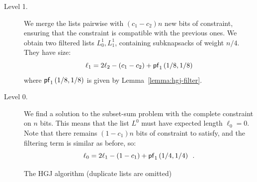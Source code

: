 \begin{description}
\item[Level 1.] We merge the lists pairwise with $(c_1 - c_2) n$ new bits of constraint, ensuring that the constraint is compatible with the previous ones. We obtain two filtered lists $L_0^1, L_1^1$, containing subknapsacks of weight $n/4$. They have size:
$$ \ell_1 = 2 \ell_2 - (c_1 - c_2) + \mathsf{pf}_1 \left(1/8, 1/8 \right) $$
where $\mathsf{pf}_1 \left(1/8, 1/8 \right)$ is given by Lemma~\ref{lemma:hgj-filter}.%

\item[Level 0.] We find a solution to the subset-sum problem with the complete constraint on $n$ bits. This means that the list $L^0$ must have expected length $\ell_0 = 0$. Note that there remains $(1 - c_1) n$ bits of constraint to satisfy, and the filtering term is similar as before, so:
$$ \ell_0 = 2 \ell_1 - (1-c_1) + \mathsf{pf}_1 \left(1/4, 1/4 \right) \enspace.$$%
\end{description}

\begin{figure}[htb]
\centering
{}
\caption{The HGJ algorithm (duplicate lists are omitted)}
\label{fig:hgj-original}
\end{figure}

